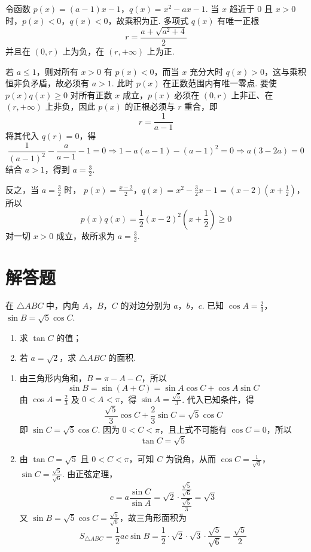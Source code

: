 \begin{solution}
令函数
\(p(x)=(a-1)x-1\)，\(q(x)=x^2-ax-1\).
当 \(x\) 趋近于 \(0\) 且 \(x>0\) 时，\(p(x)<0\)，\(q(x)<0\)，故乘积为正. 多项式 \(q(x)\) 有唯一正根
\[
r=\frac{a+\sqrt{a^2+4}}2
\]
并且在 \((0,r)\) 上为负，在 \((r,+\infty)\) 上为正.

若 \(a\leqslant1\)，则对所有 \(x>0\) 有 \(p(x)<0\)，而当 \(x\) 充分大时 \(q(x)>0\)，这与乘积恒非负矛盾，故必须有 \(a>1\). 此时 \(p(x)\) 在正数范围内有唯一零点. 要使 \(p(x)q(x)\geqslant0\) 对所有正数 \(x\) 成立，\(p(x)\) 必须在 \((0,r)\) 上非正、在 \((r,+\infty)\) 上非负，因此 \(p(x)\) 的正根必须与 \(r\) 重合，即
\[
r=\frac1{a-1}
\]
将其代入 \(q(r)=0\)，得
\[
\frac1{(a-1)^2}-\frac a{a-1}-1=0
\Longrightarrow 1-a(a-1)-(a-1)^2=0
\Longrightarrow a(3-2a)=0
\]
结合 \(a>1\)，得到 \(a=\frac32\).

反之，当 \(a=\frac32\) 时，
\(p(x)=\frac{x-2}{2}\)，\(q(x)=x^2-\frac32x-1=(x-2)\left(x+\frac12\right)\)，
所以
\[
p(x)q(x)=\frac12(x-2)^2\left(x+\frac12\right)\geqslant0
\]
对一切 \(x>0\) 成立，故所求为 \(a=\frac32\).
\end{solution}

\section{解答题}

\begin{problem}
在 \(\triangle ABC\) 中，内角 \(A\)，\(B\)，\(C\) 的对边分别为 \(a\)，\(b\)，\(c\). 已知 \(\cos A = \frac{2}{3}\)，\(\sin B = \sqrt{5} \cos C\).
\begin{enumerate}
\item 求 \(\tan C\) 的值；
\item 若 \(a = \sqrt{2}\)，求 \(\triangle ABC\) 的面积.
\end{enumerate}
\end{problem}

\begin{solution}
\begin{enumerate}
\item 由三角形内角和，\(B=\pi-A-C\)，所以
\[
\sin B=\sin(A+C)=\sin A\cos C+\cos A\sin C
\]
由 \(\cos A=\frac{2}{3}\) 及 \(0<A<\pi\)，得
\(\sin A=\frac{\sqrt{5}}{3}\). 代入已知条件，得
\[
\frac{\sqrt{5}}{3}\cos C+\frac{2}{3}\sin C=\sqrt{5}\cos C
\]
即 \(\sin C=\sqrt{5}\cos C\). 因为 \(0<C<\pi\)，且上式不可能有 \(\cos C=0\)，所以
\[
\tan C=\sqrt{5}
\]

\item 由 \(\tan C=\sqrt{5}\) 且 \(0<C<\pi\)，可知 \(C\) 为锐角，从而
\(\cos C=\frac{1}{\sqrt{6}}\)，\(\sin C=\frac{\sqrt{5}}{\sqrt{6}}\).
由正弦定理，
\[
c=a\frac{\sin C}{\sin A}=\sqrt{2}\cdot\frac{\frac{\sqrt{5}}{\sqrt{6}}}{\frac{\sqrt{5}}{3}}=\sqrt{3}
\]
又 \(\sin B=\sqrt{5}\cos C=\frac{\sqrt{5}}{\sqrt{6}}\)，故三角形面积为
\[
S_{\triangle ABC}=\frac{1}{2}ac\sin B
=\frac{1}{2}\cdot\sqrt{2}\cdot\sqrt{3}\cdot\frac{\sqrt{5}}{\sqrt{6}}
=\frac{\sqrt{5}}{2}
\]
\end{enumerate}
\end{solution}

